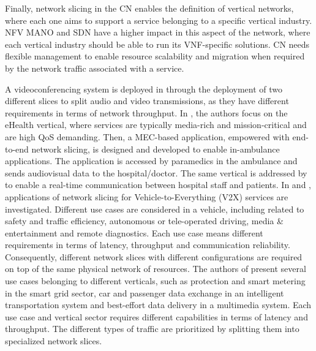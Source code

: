Finally, network slicing in the CN enables the definition of vertical networks, where each one aims to support a service belonging to a specific vertical industry. NFV MANO and SDN have a higher impact in this aspect of the network, where each vertical industry should be able to run its VNF-specific solutions. CN needs flexible management to enable resource scalability and migration when required by the network traffic associated with a service.

A videoconferencing system is deployed in \cite{Alemany2019} through the deployment of two different slices to split audio and video transmissions, as they have different requirements in terms of network throughput. 
In \cite{wang_enable_2019}, the authors focus on the eHealth vertical, where services are typically media-rich and mission-critical and are high QoS demanding. Then, a MEC-based application, empowered with end-to-end network slicing, is designed and developed to enable in-ambulance applications. The application is accessed by paramedics in the ambulance and sends audiovisual data to the hospital/doctor. The same vertical is addressed by \cite{Celdran2019} to enable a real-time communication between hospital staff and patients.
In \cite{Campolo2017} and \cite{Mei2019}, applications of network slicing for Vehicle-to-Everything (V2X) services are investigated. Different use cases are considered in a vehicle, including related to safety and traffic efficiency, autonomous or tele-operated driving, media \& entertainment and remote diagnostics. Each use case means different requirements in terms of latency, throughput and communication reliability. Consequently, different network slices with different configurations are required on top of the same physical network of resources.
The authors of \cite{Kurtz2018} present several use cases belonging to different verticals, such as protection and smart metering in the smart grid sector, %
car and passenger data exchange %
in an intelligent transportation system and best-effort data delivery in a multimedia system. Each use case and vertical sector requires different capabilities in terms of latency and throughput. The different types of traffic are prioritized by splitting them into specialized network slices.

